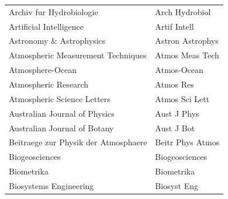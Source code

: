 \begin{longtable}{| p{8 cm} | p{6 cm} |}
Archiv fur Hydrobiologie & Arch Hydrobiol \\
Artificial Intelligence & Artif Intell \\
Astronomy \& Astrophysics & Astron Astrophys \\
Atmospheric Measurement Techniques & Atmos Meas Tech \\
Atmosphere-Ocean & Atmos-Ocean \\
Atmospheric Research & Atmos Res \\
Atmospheric Science Letters & Atmos Sci Lett \\
Australian Journal of Physics & Aust J Phys \\
Australian Journal of Botany & Aust J Bot \\
\hline
Beitraege zur Physik der Atmosphaere & Beitr Phys Atmos \\
Biogeosciences & Biogeosciences \\
Biometrika & Biometrika \\
Biosystems Engineering & Biosyst Eng \\

\hline
\end{longtable}
\newpage


